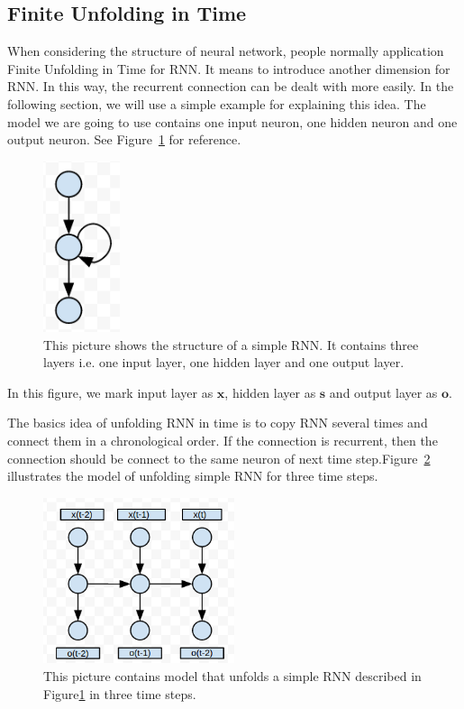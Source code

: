 \documentclass[officiallayout]{tktla}
\begin{document}
\subsection{Finite Unfolding in Time}
When considering the structure of neural network, people normally application Finite Unfolding in Time for RNN. It means to introduce another dimension for RNN. In this way, the recurrent connection can be dealt with more easily.  In the following section, we will use a simple example for explaining this idea. The model we are going to use contains one input neuron, one hidden neuron and one output neuron. See Figure~\ref{simple_rnn} for reference.
\begin{figure}[h!]
  \centering
    \includegraphics[width=0.2\textwidth]{simple_rnn}
  \caption{This picture shows the structure of a simple RNN. It contains three layers i.e. one input layer, one hidden layer and one output layer.}\label{simple_rnn}
\end{figure}

In this figure, we mark input layer as $\mathbf{x}$, hidden layer as $\mathbf{s}$ and output layer as $\mathbf{o}$.

The basics idea of unfolding RNN in time is to copy RNN several times and connect them in a chronological order. If the connection is recurrent, then the connection should be connect to the same neuron of next time step.Figure~\ref{unfolded_simple_rnn} illustrates the model of unfolding simple RNN  for three time steps.

\begin{figure}[h!]
  \centering
    \includegraphics[width=0.5\textwidth]{unfolded_simple_rnn}
  \caption{This picture contains model that unfolds a simple RNN described in Figure\ref{simple_rnn} in three time steps. }\label{unfolded_simple_rnn}
\end{figure}
\end{document}
